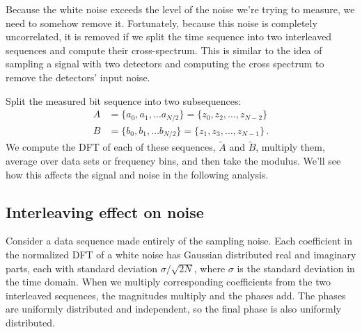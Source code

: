 \documentclass[twocolumn]{article}
\begin{document}
Because the white noise exceeds the level of the noise we're trying to measure, we need to somehow remove it.
Fortunately, because this noise is completely uncorrelated, it is removed if we split the time sequence into two interleaved sequences and compute their cross-spectrum.
This is similar to the idea of sampling a signal with two detectors and computing the cross spectrum to remove the detectors' input noise.

Split the measured bit sequence into two subsequences:
\begin{align}
A &= \{ a_0, a_1, \ldots a_{N/2} \} = \{z_0, z_2, \ldots, z_{N-2} \} \nonumber \\
B &= \{ b_0, b_1, \ldots b_{N/2} \} = \{z_1, z_3, \ldots, z_{N-1} \} \, .
\end{align}
We compute the DFT of each of these sequences, $\tilde{A}$ and $\tilde{B}$, multiply them, average over data sets or frequency bins, and then take the modulus.
We'll see how this affects the signal and noise in the following analysis.

\subsection{Interleaving effect on noise}

Consider a data sequence made entirely of the sampling noise.
Each coefficient in the normalized DFT of a white noise has Gaussian distributed real and imaginary parts, each with standard deviation $\sigma / \sqrt{2N}$, where $\sigma$ is the standard deviation in the time domain.
When we multiply corresponding coefficients from the two interleaved sequences, the magnitudes multiply and the phases add.
The phases are uniformly distributed and independent, so the final phase is also uniformly distributed.
\end{document}

